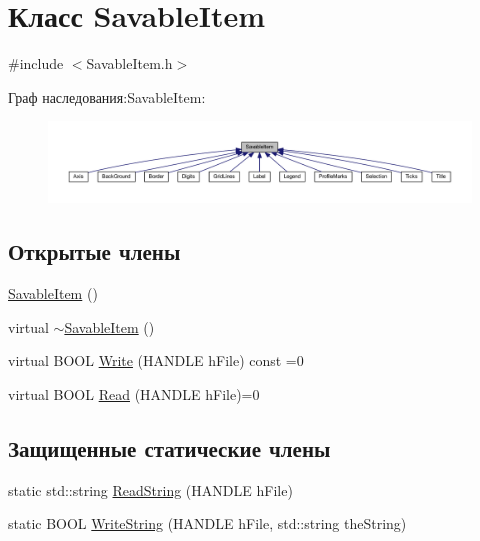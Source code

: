 \hypertarget{class_savable_item}{\section{Класс Savable\-Item}
\label{class_savable_item}
}


{\ttfamily \#include $<$Savable\-Item.\-h$>$}



Граф наследования\-:Savable\-Item\-:
\nopagebreak
\begin{figure}[H]
\begin{center}
\leavevmode
\includegraphics[width=350pt]{class_savable_item__inherit__graph}
\end{center}
\end{figure}
\subsection*{Открытые члены}
\begin{DoxyCompactItemize}
\item 
\hyperlink{class_savable_item_ab046904bea3b84bd453764fe164fcbd5}{Savable\-Item} ()
\item 
virtual \hyperlink{class_savable_item_a01e2cdaa3e35d16f31337d02e794117e}{$\sim$\-Savable\-Item} ()
\item 
virtual B\-O\-O\-L \hyperlink{class_savable_item_a0da511a4854f515096f8f9b498f64158}{Write} (H\-A\-N\-D\-L\-E h\-File) const =0
\item 
virtual B\-O\-O\-L \hyperlink{class_savable_item_a7eadd16b2cb0652091cc15f596a00fb2}{Read} (H\-A\-N\-D\-L\-E h\-File)=0
\end{DoxyCompactItemize}
\subsection*{Защищенные статические члены}
\begin{DoxyCompactItemize}
\item 
static std\-::string \hyperlink{class_savable_item_ab7fdbc1d0002d102e957104c130678d6}{Read\-String} (H\-A\-N\-D\-L\-E h\-File)
\item 
static B\-O\-O\-L \hyperlink{class_savable_item_a491b89267b8402aeb64bfeda5cef0af1}{Write\-String} (H\-A\-N\-D\-L\-E h\-File, std\-::string the\-String)
\end{DoxyCompactItemize}


